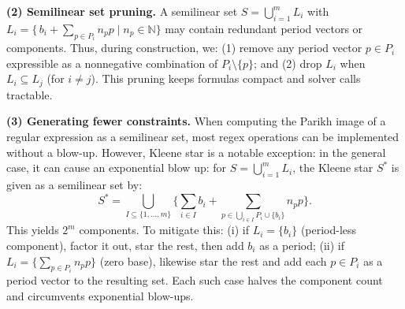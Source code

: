 
\medskip
\noindent
\textbf{(2) Semilinear set pruning.}  
A semilinear set $S=\bigcup_{i=1}^m L_i$ with 
	$L_i=\{\,b_i+\sum_{p\in P_i}n_p p \mid n_p\in\mathbb N\}$ may contain redundant 
	period vectors or components.  
	Thus, during construction, we:
	(1) remove any period vector $p\in P_i$ expressible as a nonnegative combination of $P_i\setminus\{p\}$; 
	and (2) drop $L_i$ when $L_i\subseteq L_j$ (for \(i \neq j\)).  
	This pruning keeps formulas compact and solver calls tractable.






\medskip
\noindent
\textbf{(3) Generating fewer constraints.}  
When computing the Parikh image of a regular expression as a semilinear set,
	most regex operations can be implemented without a blow-up.
	However, Kleene star is a notable exception: in the general case, it can cause an exponential blow up: for $S=\bigcup_{i=1}^m L_i$,  the Kleene star $S^\ast$ is given as a semilinear set by: 
	\[
	S^\ast=\bigcup_{I \subseteq \{1,...,m\}} 
	\Big\{\sum_{i \in I} b_i + \sum_{p \in \bigcup_{i \in I} P_i\cup \{b_i\}} n_p p\Big\}.
	\]
	This yields $2^m$ components. To mitigate this:
	(i) if $L_i=\{b_i\}$ (period-less component), factor it out, star the rest, then add $b_i$ as a period;  
	(ii) if $L_i=\{\sum_{p\in P_i}n_pp\}$ (zero base), likewise star the rest and add each $p\in P_i$ as a period vector to the resulting set.  
	Each such case halves the component count and circumvents exponential blow-ups.




